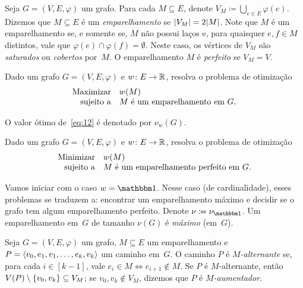 \documentclass[10pt,reqno]{amsart}
\begin{document}
Seja \(G = (V,E,\varphi)\) um grafo.  Para cada \(M \subseteq E\),
denote \(V_M \coloneqq \bigcup_{e \in E} \varphi(e)\).  Dizemos que
\(M \subseteq E\) é um \emph{emparelhamento} se
\(\lvert V_M\rvert = 2\lvert M\rvert\).  Note que \(M\) é um emparelhamento se, e
somente se, \(M\) não possui laços e, para quaisquer \(e,f \in M\)
distintos, vale que \(\varphi(e) \cap \varphi(f) = \emptyset\).  Neste
caso, os vértices de \(V_M\) são \emph{saturados} ou \emph{cobertos}
por~\(M\).  O emparelhamento \(M\) é \emph{perfeito} se \(V_M = V\).

\begin{problem*}
  Dado um grafo \(G = (V,E,\varphi)\) e \(w \colon E \to \mathbb{R}\),
  resolva o problema de otimização
  \begin{equation}
    \label{eq:12}
    \begin{array}{{rl}}
      \text{Maximizar} & w(M) \\
      \text{sujeito a} & \text{\(M\) é um emparelhamento em \(G\)}.
    \end{array}
  \end{equation}
\end{problem*}

O valor ótimo de~\eqref{eq:12} é denotado por \(\nu_w(G)\).

\begin{problem*}
  Dado um grafo \(G = (V,E,\varphi)\) e \(w \colon E \to \mathbb{R}\),
  resolva o problema de otimização
  \begin{equation}
    \label{eq:13}
    \begin{array}{{rl}}
      \text{Minimizar} & w(M) \\
      \text{sujeito a} & \text{\(M\) é um emparelhamento perfeito em \(G\)}.
    \end{array}
  \end{equation}
\end{problem*}

Vamos iniciar com o caso \(w = \ones\).  Nesse caso (de
cardinalidade), esses problemas se traduzem a: encontrar um
emparelhamento máximo e decidir se o grafo tem algum emparelhamento
perfeito.  Denote \(\nu \coloneqq \nu_{\ones}\).  Um emparelhamento
em~\(G\) de tamanho \(\nu(G)\) é \emph{máximo} (em~\(G\)).

Seja \(G = (V,E,\varphi)\) um grafo, \(M \subseteq E\) um
emparelhamento e \(P = \langle v_0,e_1,v_1,\dotsc,e_k,v_k\rangle\) um caminho
em~\(G\).  O caminho \(P\) é \emph{\(M\)-alternante} se, para cada
\(i \in [k-1]\), vale \(e_i \in M \iff e_{i+1} \not\in M\).  Se \(P\)
é \(M\)-alternante, então
\(V(P) \setminus \{v_0,v_k\} \subseteq V_M\); se \(v_0,v_k \not\in
V_M\), dizemos que \(P\) é \emph{\(M\)-aumentador}.
\end{document}
